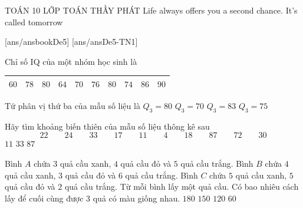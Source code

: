 \begin{name}
	{\tenchude}
	{TOÁN 10}
	{LỚP TOÁN THẦY PHÁT}
	{Life always offers you a second chance. It’s called tomorrow}
\end{name}
[ans/ansbookDe5]
\TN
{}[ans/ansDe5-TN1]
\begin{ex}%
Chỉ số IQ của một nhóm học sinh là
\begin{center}
\begin{tabular}{|l|l|l|l|l|l|l|l|l|l|}
\hline
$60$ & $78$ & $80$ & $64$ & $70$ & $76$ & $80$ & $74$ & $86$ & $90$\\
\hline
\end{tabular}
\end{center}
Tứ phân vị thứ ba của mẫu số liệu là
\choice
{\True $Q_{3}=80$}
{$Q_{3}=70$}
{$Q_{3}=83$}
{$Q_{3}=75$}
\end{ex}

\begin{ex}%
Hãy tìm khoảng biến thiên của mẫu số liệu thông kê sau
\[22\qquad 24\qquad 33\qquad 17\qquad 11\qquad 4\qquad 18\qquad 87\qquad 72\qquad 30\]
\choice
{$11$}
{$33$}
{$87$}
{}
\end{ex}

\begin{ex}%
Bình $A$ chứa $3$ quả cầu xanh, $4$ quả cầu đỏ và $5$ quả cầu trắng. Bình $B$ chứa $4$ quả cầu xanh, $3$ quả cầu đỏ và $6$ quả cầu trắng. Bình $C$ chứa $5$ quả cầu xanh, $5$ quả cầu đỏ và $2$ quả cầu trắng. Từ mỗi bình lấy một quả cầu. Có bao nhiêu cách lấy để cuối cùng được $3$ quả có màu giống nhau.
\choice
{\True $180$}
{$150$}
{$120$}
{$60$}
\end{ex}

